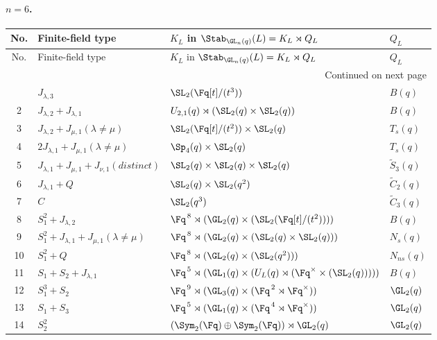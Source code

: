 \paragraph{$n=6$.}
\begin{longtable}{@{}c p{} p{} p{}@{}}
\toprule
No. & Finite-field type & $K_L$ in $\Stab_{\GL_n(q)}(L)=K_L\rtimes Q_L$ & $Q_L$ \\
\midrule
\endfirsthead
\toprule
No. & Finite-field type & $K_L$ in $\Stab_{\GL_n(q)}(L)=K_L\rtimes Q_L$ & $Q_L$ \\
\midrule
\endhead
\midrule
\multicolumn{4}{r}{Continued on next page}\\
\midrule
\endfoot
\bottomrule
\endlastfoot
1 & $J_{\lambda,3}$ & $\SL_2(\Fq[t]/(t^3))$ & $B(q)$ \\
2 & $J_{\lambda,2} + J_{\lambda,1}$ & $U_{2,1}(q)\rtimes (\SL_2(q)\times \SL_2(q))$ & $B(q)$ \\
3 & $J_{\lambda,2} + J_{\mu,1} (\lambda \neq \mu)$ & $\SL_2(\Fq[t]/(t^2))\times \SL_2(q)$ & $T_s(q)$ \\
4 & $2J_{\lambda,1} + J_{\mu,1} (\lambda \neq \mu)$ & $\Sp_4(q)\times \SL_2(q)$ & $T_s(q)$ \\
5 & $J_{\lambda,1} + J_{\mu,1} + J_{\nu,1} (distinct)$ & $\SL_2(q)\times \SL_2(q)\times \SL_2(q)$ & $\widetilde{S}_3(q)$ \\
6 & $J_{\lambda,1} + Q$ & $\SL_2(q)\times \SL_2(q^2)$ & $\widetilde{C}_2(q)$ \\
7 & $C$ & $\SL_2(q^3)$ & $\widetilde{C}_3(q)$ \\
8 & $S_1^2 + J_{\lambda,2}$ & $\Fq^{\,8}\rtimes (\GL_2(q)\times (\SL_2(\Fq[t]/(t^2))))$ & $B(q)$ \\
9 & $S_1^2 + J_{\lambda,1} + J_{\mu,1} (\lambda \neq \mu)$ & $\Fq^{\,8}\rtimes (\GL_2(q)\times (\SL_2(q)\times \SL_2(q)))$ & $N_s(q)$ \\
10 & $S_1^2 + Q$ & $\Fq^{\,8}\rtimes (\GL_2(q)\times (\SL_2(q^2)))$ & $N_{ns}(q)$ \\
11 & $S_1 + S_2 + J_{\lambda,1}$ & $\Fq^{\,5}\rtimes (\GL_1(q)\times (U_L(q)\rtimes (\Fq^\times\times (\SL_2(q)))))$ & $B(q)$ \\
12 & $S_1^3 + S_2$ & $\Fq^{\,9}\rtimes (\GL_3(q)\times (\Fq^{\,2}\rtimes \Fq^\times))$ & $\GL_2(q)$ \\
13 & $S_1 + S_3$ & $\Fq^{\,5}\rtimes (\GL_1(q)\times (\Fq^{\,4}\rtimes \Fq^\times))$ & $\GL_2(q)$ \\
14 & $S_2^2$ & $(\Sym_2(\Fq)\oplus \Sym_2(\Fq))\rtimes \GL_2(q)$ & $\GL_2(q)$ \\
\end{longtable}

